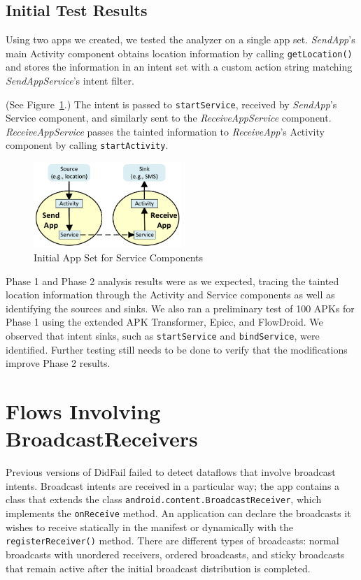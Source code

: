 \section{Initial Test Results}
Using two apps we created, we tested the analyzer on a single app set. \emph{SendApp}'s main Activity component obtains location information by calling \texttt{getLocation()} and stores the information in an intent set with a custom action string matching \emph{SendAppService}'s intent filter.

(See Figure~\ref{fig:servicetest1}.) The intent is passed to \texttt{startService}, received by \emph{SendApp}'s Service component, and similarly sent to the \emph{ReceiveAppService} component. \emph{ReceiveAppService} passes the tainted information to \emph{ReceiveApp}'s Activity component by calling \texttt{startActivity}.

\begin{figure}[h]
	\centering
	\includegraphics[width=0.50\textwidth]{serviceapps_v2.png}
	\caption{Initial App Set for Service Components}
	\label{fig:servicetest1}
\end{figure}

Phase 1 and Phase 2 analysis results were as we expected, tracing the tainted location information through the Activity and Service components as well as identifying the sources and sinks. We also ran a preliminary test of 100 APKs for Phase 1 using the extended APK Transformer, Epicc, and FlowDroid. We observed that intent sinks, such as \texttt{startService} and \texttt{bindService}, were identified. Further testing still needs to be done to verify that the modifications improve Phase 2 results.

\chapter{Flows Involving BroadcastReceivers} \label{chap:broadcast_receivers}
Previous versions of DidFail failed to detect dataflows that involve broadcast intents. Broadcast intents are received in a particular way; the app contains a class that extends the class \texttt{android.content.BroadcastReceiver}, which implements the \texttt{onReceive} method. An application can declare the broadcasts it wishes to receive statically in the manifest or dynamically with the \texttt{registerReceiver()} method. There are different types of broadcasts: normal broadcasts with unordered receivers, ordered broadcasts, and sticky broadcasts that remain active after the initial broadcast distribution is completed.

